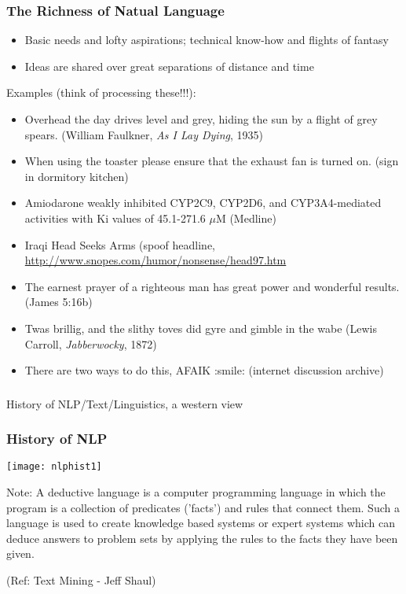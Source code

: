 \begin{frame}[fragile]\frametitle{The Richness of Natual Language}
\begin{itemize}
\item Basic needs and lofty aspirations; technical know-how and
 flights of fantasy
\item Ideas are shared over great separations of distance and time
\end{itemize}

Examples (think of processing these!!!): 
\scriptsize

\begin{itemize}
\item Overhead the day drives level and grey, hiding the sun by a flight
  of grey spears.  (William Faulkner, \textit{As I Lay Dying}, 1935)
\item When using the toaster please ensure that the exhaust fan is turned
  on. (sign in dormitory kitchen)
\item Amiodarone weakly inhibited CYP2C9, CYP2D6, and CYP3A4-mediated
  activities with Ki values of 45.1-271.6 $\mu$M (Medline)
\item Iraqi Head Seeks Arms (spoof headline, \url{http://www.snopes.com/humor/nonsense/head97.htm}
\item The earnest prayer of a righteous man has great power and wonderful
  results. (James 5:16b)
\item Twas brillig, and the slithy toves did gyre and gimble in the wabe
  (Lewis Carroll, \textit{Jabberwocky}, 1872)
\item There are two ways to do this, AFAIK :smile:  (internet discussion archive)
\end{itemize}
\end{frame}

\begin{frame}[fragile]\frametitle{}

\begin{center}
{\Large History of NLP/Text/Linguistics, a western view}
\end{center}
\end{frame}

  
\begin{frame}[fragile]\frametitle{History of NLP}
\begin{center}
\texttt{[image: nlphist1]}
\end{center}

{\tiny Note: A deductive language is a computer programming language in which the program is a collection of predicates ('facts') and rules that connect them. Such a language is used to create knowledge based systems or expert systems which can deduce answers to problem sets by applying the rules to the facts they have been given.

(Ref: Text Mining - Jeff Shaul)}
\end{frame}

